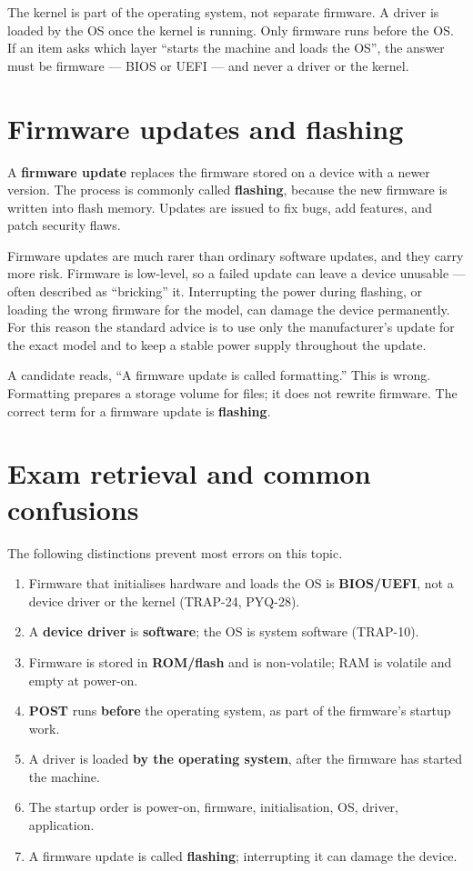 The kernel is part of the operating system, not separate firmware. A driver
is loaded by the OS once the kernel is running. Only firmware runs before the
OS. If an item asks which layer ``starts the machine and loads the OS'', the
answer must be firmware --- BIOS or UEFI --- and never a driver or the
kernel.

\section{Firmware updates and flashing}
A \textbf{firmware update} replaces the firmware stored on a device with a
newer version. The process is commonly called \textbf{flashing}, because the
new firmware is written into flash memory. Updates are issued to fix bugs,
add features, and patch security flaws.

Firmware updates are much rarer than ordinary software updates, and they
carry more risk. Firmware is low-level, so a failed update can leave a device
unusable --- often described as ``bricking'' it. Interrupting the power
during flashing, or loading the wrong firmware for the model, can damage the
device permanently. For this reason the standard advice is to use only the
manufacturer's update for the exact model and to keep a stable power supply
throughout the update.

\begin{example}
A candidate reads, ``A firmware update is called formatting.'' This is wrong.
Formatting prepares a storage volume for files; it does not rewrite firmware.
The correct term for a firmware update is \textbf{flashing}.
\end{example}

\section{Exam retrieval and common confusions}
The following distinctions prevent most errors on this topic.

\begin{enumerate}
  \item Firmware that initialises hardware and loads the OS is
    \textbf{BIOS/UEFI}, not a device driver or the kernel (TRAP-24, PYQ-28).
  \item A \textbf{device driver} is \textbf{software}; the OS is system
    software (TRAP-10).
  \item Firmware is stored in \textbf{ROM/flash} and is non-volatile; RAM is
    volatile and empty at power-on.
  \item \textbf{POST} runs \textbf{before} the operating system, as part of
    the firmware's startup work.
  \item A driver is loaded \textbf{by the operating system}, after the
    firmware has started the machine.
  \item The startup order is power-on, firmware, initialisation, OS, driver,
    application.
  \item A firmware update is called \textbf{flashing}; interrupting it can
    damage the device.
\end{enumerate}

